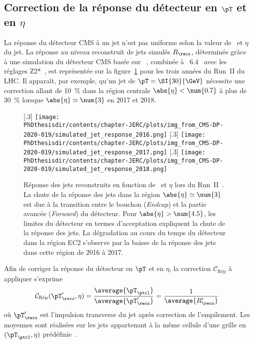 \subsection{Correction de la réponse du détecteur en $\pT$ et en $\eta$}\label{chapter-JERC-section-CMS-subsec-reponse}
La réponse du détecteur CMS à un jet n'est pas uniforme selon la valeur de \pT\ et $\eta$ du jet.
La réponse au niveau reconstruit de jets simulés $R_\reco$,
déterminée grâce à une simulation du détecteur CMS basée sur \GEANTfour~\cite{geant4},
combinée à \PYTHIA~6.4~\cite{pythia6.4}
avec les réglages Z2*~\cite{tunes_2016},
est représentée sur la figure~\ref{fig-simulated_jet_response_RunII} pour les trois années du Run~II du LHC.
Il apparaît, par exemple, qu'un jet de $\pT=\SI{30}{\GeV}$ nécessite une correction allant de \SI{10}{\%} dans la région centrale $\abs{\eta}<\num{0.7}$ à plus de \SI{30}{\%} lorsque $\abs{\eta}\simeq\num{3}$ en 2017 et 2018.
\begin{figure}[h]
\centering
{}[.3\textwidth]
{\texttt{[image: \\PhDthesisdir/contents/chapter-JERC/plots/img\_from\_CMS-DP-2020-019/simulated\_jet\_response\_2016.png]}}
\hfill
{}[.3\textwidth]
{\texttt{[image: \\PhDthesisdir/contents/chapter-JERC/plots/img\_from\_CMS-DP-2020-019/simulated\_jet\_response\_2017.png]}}
\hfill
{}[.3\textwidth]
{\texttt{[image: \\PhDthesisdir/contents/chapter-JERC/plots/img\_from\_CMS-DP-2020-019/simulated\_jet\_response\_2018.png]}}
\caption[Réponse des jets reconstruits en fonction de \pT\ et $\eta$ lors du Run~II.]{Réponse des jets reconstruits en fonction de \pT\ et $\eta$ lors du Run~II~\cite{CMS-DP-2020-019}. La chute de la réponse des jets dans la région $\abs{\eta}\simeq\num{3}$ est due à la transition entre le bouchon (\emph{Endcap}) et la partie avancée (\emph{Forward}) du détecteur. Pour $\abs{\eta}>\num{4.5}$, les limites du détecteur en termes d'acceptation expliquent la chute de la réponse des jets. La dégradation au cours du temps du détecteur dans la région \og EC2 \fg{} s'observe par la baisse de la réponse des jets dans cette région de 2016 à 2017.}
\label{fig-simulated_jet_response_RunII}
\end{figure}
\par Afin de corriger la réponse du détecteur en $\pT$ et en $\eta$, la correction $\mathcal{C}_\text{Rép}$ à appliquer s'exprime
\begin{equation}
\mathcal{C}_\text{Rép}(\pT_\reco', \eta) = \frac{\average{\pT_\ptcl}}{\average{\pT_\reco'}} = \frac{1}{\average{R_\reco'}}
\end{equation}
où $\pT_\reco'$ est l'impulsion transverse du jet après correction de l'empilement.
Les moyennes sont réalisées sur les jets appartenant à la même cellule d'une grille en $(\pT_\ptcl, \eta)$ prédéfinie~\cite{JERC_RunI}.
